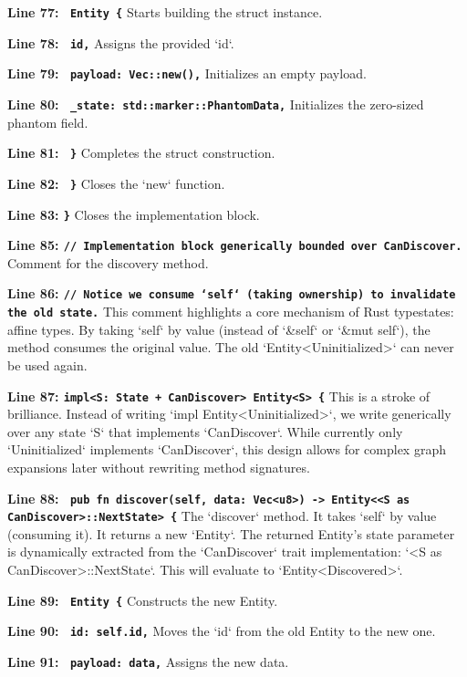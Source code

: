 \textbf{Line 77: \texttt{        Entity \{}}
Starts building the struct instance.

\textbf{Line 78: \texttt{            id,}}
Assigns the provided `id`.

\textbf{Line 79: \texttt{            payload: Vec::new(),}}
Initializes an empty payload.

\textbf{Line 80: \texttt{            \_state: std::marker::PhantomData,}}
Initializes the zero-sized phantom field.

\textbf{Line 81: \texttt{        \}}}
Completes the struct construction.

\textbf{Line 82: \texttt{    \}}}
Closes the `new` function.

\textbf{Line 83: \texttt{\}}}
Closes the implementation block.

\textbf{Line 85: \texttt{// Implementation block generically bounded over CanDiscover.}}
Comment for the discovery method.

\textbf{Line 86: \texttt{// Notice we consume `self` (taking ownership) to invalidate the old state.}}
This comment highlights a core mechanism of Rust typestates: affine types. By taking `self` by value (instead of `\&self` or `\&mut self`), the method consumes the original value. The old `Entity<Uninitialized>` can never be used again.

\textbf{Line 87: \texttt{impl<S: State + CanDiscover> Entity<S> \{}}
This is a stroke of brilliance. Instead of writing `impl Entity<Uninitialized>`, we write generically over any state `S` that implements `CanDiscover`. While currently only `Uninitialized` implements `CanDiscover`, this design allows for complex graph expansions later without rewriting method signatures.

\textbf{Line 88: \texttt{    pub fn discover(self, data: Vec<u8>) -> Entity<<S as CanDiscover>::NextState> \{}}
The `discover` method. It takes `self` by value (consuming it). It returns a new `Entity`. The returned Entity's state parameter is dynamically extracted from the `CanDiscover` trait implementation: `<S as CanDiscover>::NextState`. This will evaluate to `Entity<Discovered>`.

\textbf{Line 89: \texttt{        Entity \{}}
Constructs the new Entity.

\textbf{Line 90: \texttt{            id: self.id,}}
Moves the `id` from the old Entity to the new one.

\textbf{Line 91: \texttt{            payload: data,}}
Assigns the new data.

